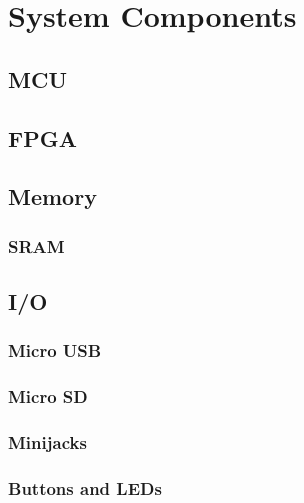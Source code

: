 \section{System Components}
\subsection{MCU}

\subsection{FPGA}

\subsection{Memory}
\subsubsection{SRAM}

\subsection{I/O}
\subsubsection{Micro USB}
\subsubsection{Micro SD}
\subsubsection{Minijacks}
\subsubsection{Buttons and LEDs}